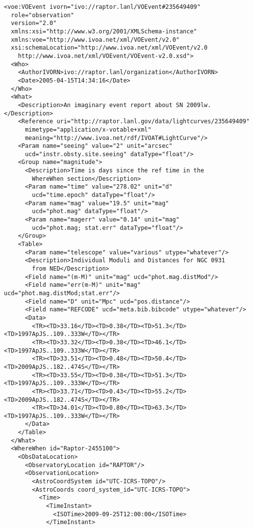 \documentclass[11pt,a4paper]{ivoa}
\begin{document}
\begin{lstlisting}
<voe:VOEvent ivorn="ivo://raptor.lanl/VOEvent#235649409"
  role="observation"
  version="2.0"
  xmlns:xsi="http://www.w3.org/2001/XMLSchema-instance"
  xmlns:voe="http://www.ivoa.net/xml/VOEvent/v2.0"
  xsi:schemaLocation="http://www.ivoa.net/xml/VOEvent/v2.0
    http://www.ivoa.net/xml/VOEvent/VOEvent-v2.0.xsd">
  <Who>
    <AuthorIVORN>ivo://raptor.lanl/organization</AuthorIVORN>
    <Date>2005-04-15T14:34:16</Date>
  </Who>
  <What>
    <Description>An imaginary event report about SN 2009lw.</Description>
    <Reference uri="http://raptor.lanl.gov/data/lightcurves/235649409"
      mimetype="application/x-votable+xml"
      meaning="http://www.ivoa.net/rdf/IVOAT#LightCurve"/>
    <Param name="seeing" value="2" unit="arcsec"
      ucd="instr.obsty.site.seeing" dataType="float"/>
    <Group name="magnitude">
      <Description>Time is days since the ref time in the
        WhereWhen section</Description>
      <Param name="time" value="278.02" unit="d"
        ucd="time.epoch" dataType="float"/>
      <Param name="mag" value="19.5" unit="mag"
        ucd="phot.mag" dataType="float"/>
      <Param name="magerr" value="0.14" unit="mag"
        ucd="phot.mag; stat.err" dataType="float"/>
    </Group>
    <Table>
      <Param name="telescope" value="various" utype="whatever"/>
      <Description>Individual Moduli and Distances for NGC 0931
        from NED</Description>
      <Field name="(m-M)" unit="mag" ucd="phot.mag.distMod"/>
      <Field name="err(m-M)" unit="mag" ucd="phot.mag.distMod;stat.err"/>
      <Field name="D" unit="Mpc" ucd="pos.distance"/>
      <Field name="REFCODE" ucd="meta.bib.bibcode" utype="whatever"/>
      <Data>
        <TR><TD>33.16</TD><TD>0.38</TD><TD>51.3</TD><TD>1997ApJS..109..333W</TD></TR>
        <TR><TD>33.32</TD><TD>0.38</TD><TD>46.1</TD><TD>1997ApJS..109..333W</TD></TR>
        <TR><TD>33.51</TD><TD>0.48</TD><TD>50.4</TD><TD>2009ApJS..182..474S</TD></TR>
        <TR><TD>33.55</TD><TD>0.38</TD><TD>51.3</TD><TD>1997ApJS..109..333W</TD></TR>
        <TR><TD>33.71</TD><TD>0.43</TD><TD>55.2</TD><TD>2009ApJS..182..474S</TD></TR>
        <TR><TD>34.01</TD><TD>0.80</TD><TD>63.3</TD><TD>1997ApJS..109..333W</TD></TR>
      </Data>
    </Table>
  </What>
  <WhereWhen id="Raptor-2455100">
    <ObsDataLocation>
      <ObservatoryLocation id="RAPTOR"/>
      <ObservationLocation>
        <AstroCoordSystem id="UTC-ICRS-TOPO"/>
        <AstroCoords coord_system_id="UTC-ICRS-TOPO">
          <Time>
            <TimeInstant>
              <ISOTime>2009-09-25T12:00:00</ISOTime>
            </TimeInstant>

\end{lstlisting}
\end{document}

